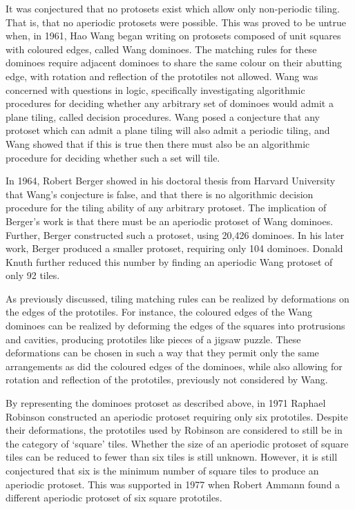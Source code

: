 \documentclass[
  oneside,
  11pt, a4paper,
  footinclude=true,
  headinclude=true,
  cleardoublepage=empty
]{scrbook}
\begin{document}
It was conjectured that no protosets exist which allow only non-periodic tiling. That is, that no aperiodic protosets were possible. This was proved to be untrue when, in 1961, Hao Wang began writing on protosets composed of unit squares with coloured edges, called Wang dominoes. The matching rules for these dominoes require adjacent dominoes to share the same colour on their abutting edge, with rotation and reflection of the prototiles not allowed. Wang was concerned with questions in logic, specifically investigating algorithmic procedures for deciding whether any arbitrary set of dominoes would admit a plane tiling, called decision procedures. Wang posed a conjecture that any protoset which can admit a plane tiling will also admit a periodic tiling, and Wang showed that if this is true then there must also be an algorithmic procedure for deciding whether such a set will tile. 

In 1964, Robert Berger showed in his doctoral thesis from Harvard University that Wang's conjecture is false, and that there is no algorithmic decision procedure for the tiling ability of any arbitrary protoset. The implication of Berger's work is that there must be an aperiodic protoset of Wang dominoes. Further, Berger constructed such a protoset, using 20,426 dominoes. In his later work, Berger produced a smaller protoset, requiring only 104 dominoes. Donald Knuth further reduced this number by finding an aperiodic Wang protoset of only 92 tiles.

As previously discussed, tiling matching rules can be realized by deformations on the edges of the prototiles. For instance, the coloured edges of the Wang dominoes can be realized by deforming the edges of the squares into protrusions and cavities, producing prototiles like pieces of a jigsaw puzzle. These deformations can be chosen in such a way that they permit only the same arrangements as did the coloured edges of the dominoes, while also allowing for rotation and reflection of the prototiles, previously not considered by Wang. 

By representing the dominoes protoset as described above, in 1971 Raphael Robinson constructed an aperiodic protoset requiring only six prototiles. Despite their deformations, the prototiles used by Robinson are considered to still be in the category of `square' tiles. Whether the size of an aperiodic protoset of square tiles can be reduced to fewer than six tiles is still unknown. However, it is still conjectured that six is the minimum number of square tiles to produce an aperiodic protoset. This was supported in 1977 when Robert Ammann found a different aperiodic protoset of six square prototiles.
\end{document}
